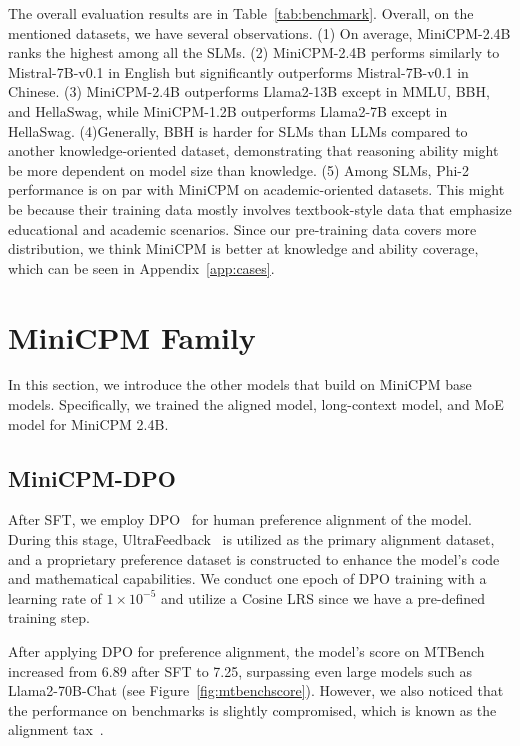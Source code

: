 \documentclass[dvipsnames]{article}
\begin{document}
The overall evaluation results are in Table~\ref{tab:benchmark}. Overall, on the mentioned datasets, we have several observations. (1) On average, MiniCPM-2.4B ranks the highest among all the SLMs. (2) MiniCPM-2.4B performs similarly to Mistral-7B-v0.1 in English but significantly outperforms Mistral-7B-v0.1 in Chinese. (3) MiniCPM-2.4B outperforms Llama2-13B except in MMLU, BBH, and HellaSwag, while MiniCPM-1.2B outperforms Llama2-7B except in HellaSwag. (4)Generally, BBH is harder for SLMs than LLMs compared to another knowledge-oriented dataset, demonstrating that reasoning ability might be more dependent on model size than knowledge. (5) Among SLMs, Phi-2 performance is on par with MiniCPM on academic-oriented datasets. This might be because their training data mostly involves textbook-style data that emphasize educational and academic scenarios. Since our pre-training data covers more distribution, we think MiniCPM is better at knowledge and ability coverage, which can be seen in Appendix~\ref{app:cases}.

\section{MiniCPM Family}
In this section, we introduce the other models that build on MiniCPM base models. Specifically, we trained the aligned model, long-context model, and MoE model for MiniCPM 2.4B.

\subsection{MiniCPM-DPO}
\label{app:rlhf}
After SFT, we employ DPO~\citep{rafailov2024direct} for human preference alignment of the
model. During this stage, UltraFeedback~\citep{cui2023ultrafeedback} is utilized as the primary alignment dataset, and a proprietary preference dataset is constructed to enhance the model's code and mathematical capabilities. We conduct one epoch of DPO training with a learning rate of $1\times 10^{-5}$ and utilize a Cosine LRS since we have a pre-defined training step.
 
After applying DPO for preference alignment, the model's score on MTBench~\citep{zheng2024judging} increased from 6.89 after SFT to 7.25, surpassing even large models such as Llama2-70B-Chat (see Figure~\ref{fig:mtbenchscore}). However, we also noticed that the performance on benchmarks is slightly compromised, which is known as the alignment tax~\citep{askell2021general}.
\end{document}
